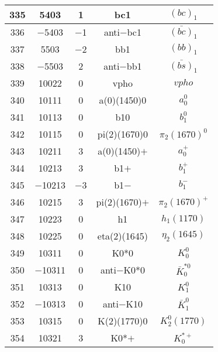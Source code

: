 \documentclass{article}
\begin{document}
\begin{table}[!htbp]
\begin{tabular}{|c|c|c|c|c|}
\hline
335 & 5403 & 1 & bc\underline{\hspace{0.6em}}1 & $(bc)_{1}$ \\
\hline
336 & $-$5403 & $-$1 & anti$-$bc\underline{\hspace{0.6em}}1 & $\bar{(bc)}_{1}$ \\
\hline
337 & 5503 & $-$2 & bb\underline{\hspace{0.6em}}1 & $(bb)_{1}$ \\
\hline
338 & $-$5503 & 2 & anti$-$bb\underline{\hspace{0.6em}}1 & $\bar{(bs)}_{1}$ \\
\hline
339 & 10022 & 0 & vpho & $vpho$ \\
\hline
340 & 10111 & 0 & a(0)(1450)0 & $a_{0}^{0}$ \\
\hline
341 & 10113 & 0 & b\underline{\hspace{0.6em}}10 & $b_{1}^{0}$ \\
\hline
342 & 10115 & 0 & pi(2)(1670)0 & $\pi_{2}(1670)^{0}$ \\
\hline
343 & 10211 & 3 & a(0)(1450)$+$ & $a_{0}^{+}$ \\
\hline
344 & 10213 & 3 & b\underline{\hspace{0.6em}}1$+$ & $b_{1}^{+}$ \\
\hline
345 & $-$10213 & $-$3 & b\underline{\hspace{0.6em}}1$-$ & $b_{1}^{-}$ \\
\hline
346 & 10215 & 3 & pi(2)(1670)$+$ & $\pi_{2}(1670)^{+}$ \\
\hline
347 & 10223 & 0 & h\underline{\hspace{0.6em}}1 & $h_{1}(1170)$ \\
\hline
348 & 10225 & 0 & eta(2)(1645) & $\eta_{2}(1645)$ \\
\hline
349 & 10311 & 0 & K\underline{\hspace{0.6em}}0*0 & $K_0^{0}$ \\
\hline
350 & $-$10311 & 0 & anti$-$K\underline{\hspace{0.6em}}0*0 & $\bar{K}_0^{*0}$ \\
\hline
351 & 10313 & 0 & K\underline{\hspace{0.6em}}10 & $K_1^{0}$ \\
\hline
352 & $-$10313 & 0 & anti$-$K\underline{\hspace{0.6em}}10 & $\bar{K}_1^{0}$ \\
\hline
353 & 10315 & 0 & K(2)(1770)0 & $K_2^0(1770)$ \\
\hline
354 & 10321 & 3 & K\underline{\hspace{0.6em}}0*$+$ & $K_{0}^{*+}$ \\

\end{tabular}
\end{table}
\end{document}
